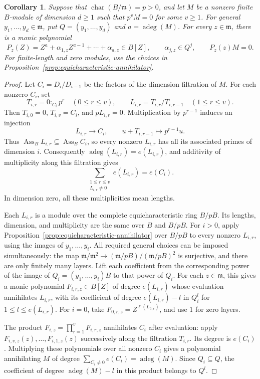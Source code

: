 \documentclass[11pt,reqno]{amsart}
\numberwithin{equation}{section}
\newtheorem{corollary}[theorem]{Corollary}
\theoremstyle{definition}
\newcommand{\m}{\mathfrak m}
\newcommand{\adeg}{\operatorname{adeg}}
\newcommand{\Ass}{\operatorname{Ass}}
\begin{document}
\begin{corollary}
\label{cor:prime-power-annihilator}
Suppose that $\operatorname{char}(B/\m)=p>0$, and let $M$ be a
nonzero finite $B$-module of dimension $d\ge1$ such that
$p^vM=0$ for some $v\ge1$.
For general $y_1,\ldots,y_d\in\m$, put $Q=(y_1,\ldots,y_d)$ and
$a=\adeg(M)$. For every $z\in\m$, there is a monic polynomial
\[
 P_z(Z)=Z^a+\alpha_{1,z}Z^{a-1}+\cdots+\alpha_{a,z}\in B[Z],
 \qquad \alpha_{j,z}\in Q^j,
 \qquad P_z(z)M=0.
\]
For finite-length and zero modules, use the choices in
Proposition~\ref{prop:equicharacteristic-annihilator}.
\end{corollary}

\begin{proof}
Let $C_i=D_i/D_{i-1}$ be the factors of the dimension filtration of
$M$. For each nonzero $C_i$, set
\[
 T_{i,r}=0:_{C_i}p^r\quad(0\le r\le v),\qquad
 L_{i,r}=T_{i,r}/T_{i,r-1}\quad(1\le r\le v).
\]
Then $T_{i,0}=0$, $T_{i,v}=C_i$, and $pL_{i,r}=0$.
Multiplication by $p^{r-1}$ induces an injection
\[
 L_{i,r}\longrightarrow C_i,\qquad
 u+T_{i,r-1}\longmapsto p^{r-1}u.
\]
Thus $\Ass_B L_{i,r}\subseteq\Ass_B C_i$, so every nonzero
$L_{i,r}$ has all its associated primes of dimension $i$.
Consequently $\adeg(L_{i,r})=e(L_{i,r})$, and additivity of
multiplicity along this filtration gives
\[
 \sum_{\substack{1\le r\le v\\L_{i,r}\ne0}}e(L_{i,r})=e(C_i).
\]
In dimension zero, all these multiplicities mean lengths.

Each $L_{i,r}$ is a module over the complete equicharacteristic
ring $B/pB$. Its lengths, dimension, and multiplicity are the same
over $B$ and $B/pB$. For $i>0$, apply
Proposition~\ref{prop:equicharacteristic-annihilator} over $B/pB$
to every nonzero $L_{i,r}$, using the images of
$y_1,\ldots,y_i$. All required general choices can be imposed
simultaneously: the map
$\m/\m^2\to(\m/pB)/(\m/pB)^2$ is surjective, and there are
only finitely many layers.
Lift each coefficient from the corresponding power of the image
of $Q_i=(y_1,\ldots,y_i)B$ to that power of $Q_i$.
For each $z\in\m$, this gives a monic polynomial $F_{i,r,z}\in B[Z]$
of degree $e(L_{i,r})$ whose evaluation annihilates $L_{i,r}$,
with its coefficient of degree $e(L_{i,r})-l$ in $Q_i^l$
for $1\le l\le e(L_{i,r})$.
For $i=0$, take $F_{0,r,z}=Z^{\ell(L_{0,r})}$, and use $1$
for zero layers.

The product $F_{i,z}=\prod_{r=1}^vF_{i,r,z}$ annihilates $C_i$
after evaluation: apply $F_{i,v,z}(z),\ldots,F_{i,1,z}(z)$
successively along the filtration $T_{i,r}$.
Its degree is $e(C_i)$.
Multiplying these polynomials over all nonzero $C_i$ gives
a polynomial annihilating $M$ of degree
$\sum_{C_i\ne0}e(C_i)=\adeg(M)$. Since $Q_i\subseteq Q$, the coefficient
of degree $\adeg(M)-l$ in this product belongs to $Q^l$.
\end{proof}
\end{document}
